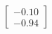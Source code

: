 \documentclass[preview]{standalone}
\begin{document}
\begin{align*}
\begin{bmatrix} -0.10 \\ -0.94 \end{bmatrix}
\end{align*}
\end{document}

